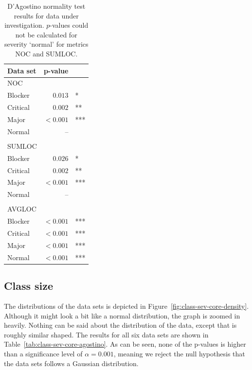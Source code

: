 \begin{table}[!ht]\footnotesize
	\centering
	\begin{tabular}{lrl}
		\toprule
		Data set & p-value & \\
		\midrule
		NOC \\ 
		\midrule
		Blocker & $0.013$ & * \\
		Critical & $0.002$ & ** \\
		Major & $< 0.001$ & *** \\
		Normal & --\\\\
		\midrule
		SUMLOC \\
		\midrule
		Blocker & $0.026$ & * \\
		Critical & $0.002$ & ** \\
		Major & $< 0.001$ & *** \\
		Normal & -- \\\\
		\midrule
		AVGLOC \\
		\midrule
		Blocker & $< 0.001$ & *** \\
		Critical & $< 0.001$ & *** \\
		Major & $< 0.001$ & *** \\
		Normal & $< 0.001$ & *** \\
		\bottomrule
	\end{tabular} 
	\caption{D'Agostino normality test results for data under investigation. $p$-values could not be calculated for severity `normal' for metrics NOC and SUMLOC.}
	\label{tab:package-sev-core-agostino}
\end{table}


\subsection{Class size} %
\label{sub:norm:class_size}
The distributions of the data sets is depicted in Figure~\ref{fig:class-sev-core-density}. Although it might look a bit like a normal distribution, the graph is zoomed in heavily. Nothing can be said about the distribution of the data, except that is roughly similar shaped. The results for all six data sets are shown in Table~\ref{tab:class-sev-core-agostino}. As can be seen, none of the p-values is higher than a significance level of $\alpha = 0.001$, meaning we reject the null hypothesis that the data sets follows a Gaussian distribution.

